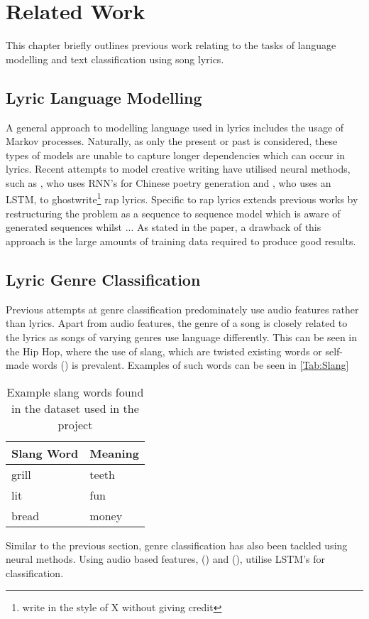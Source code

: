\chapter{Related Work}
\label{chap:related_work}
This chapter briefly outlines previous work relating to the tasks of language modelling and text classification using song lyrics.

\section{Lyric Language Modelling}
A general approach to modelling language used in lyrics includes the usage of Markov processes. Naturally, as only the present or past is considered, these types of models are unable to capture longer dependencies which can occur in lyrics. Recent attempts to model creative writing have utilised neural methods, such as \cite{Zhang2014}, who uses RNN's for Chinese poetry generation and \cite{Potash2015}, who uses an LSTM, to ghostwrite\footnote{write in the style of X without giving credit} rap lyrics. Specific to rap lyrics \cite{Hulzebosch2017} extends previous works by restructuring the problem as a sequence to sequence model which is aware of generated sequences whilst ... As stated in the paper, a drawback of this  approach is the large amounts of training data required to produce good results.
\section{Lyric Genre Classification}
Previous attempts at genre classification predominately use audio features rather than lyrics. Apart from audio features, the genre of a song is closely related to the lyrics as songs of varying genres use language differently. This can be seen in the Hip Hop, where the use of slang, which are twisted existing words or self-made words (\cite{Edwards2009}) is prevalent. Examples of such words can be seen in \autoref{Tab:Slang}
\begin{table}[ht]
	\caption{Example slang words found in the dataset used in the project}
	\centering
	\begin{tabular}{ | p{5cm} | p{5cm} |}
		\hline
		\textbf{Slang Word} & \textbf{Meaning}\\ \hline
		grill & teeth\\ \hline
		lit & fun\\ \hline
		bread & money \\ \hline
	\end{tabular}
	\label{Tab:Slang}
\end{table}
\newline
Similar to the previous section, genre classification has also been tackled using neural methods. Using audio based features, (\cite{Irvin2016}) and (\cite{Pui2018}), utilise LSTM's for classification. 